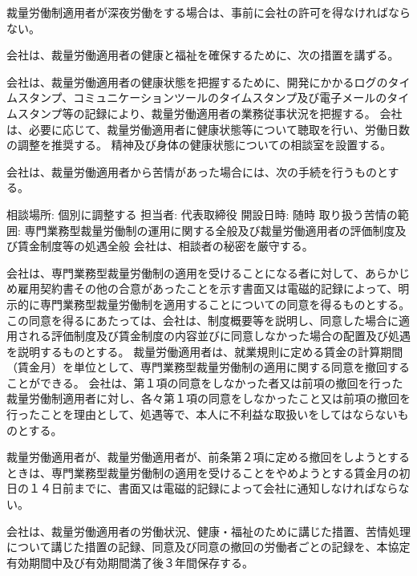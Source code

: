 \documentclass[10pt,a4paper,uplatex]{jsarticle}
\begin{document}
裁量労働制適用者が深夜労働をする場合は、事前に会社の許可を得なければならない。

会社は、裁量労働適用者の健康と福祉を確保するために、次の措置を講ずる。
\begin{enumerate}
    \itm 会社は、裁量労働適用者の健康状態を把握するために、開発にかかるログのタイムスタンプ、コミュニケーションツールのタイムスタンプ及び電子メールのタイムスタンプ等の記録により、裁量労働適用者の業務従事状況を把握する。
    \itm 会社は、必要に応じて、裁量労働適用者に健康状態等について聴取を行い、労働日数の調整を推奨する。
    \itm 精神及び身体の健康状態についての相談室を設置する。
\end{enumerate}

会社は、裁量労働適用者から苦情があった場合には、次の手続を行うものとする。
\begin{enumerate}
    \itm 相談場所: 個別に調整する
    \itm 担当者: 代表取締役
    \itm 開設日時: 随時
    \itm 取り扱う苦情の範囲: 専門業務型裁量労働制の運用に関する全般及び裁量労働適用者の評価制度及び賃金制度等の処遇全般
    \itm 会社は、相談者の秘密を厳守する。
\end{enumerate}

会社は、専門業務型裁量労働制の適用を受けることになる者に対して、あらかじめ雇用契約書その他の合意があったことを示す書面又は電磁的記録によって、明示的に専門業務型裁量労働制を適用することについての同意を得るものとする。この同意を得るにあたっては、会社は、制度概要等を説明し、同意した場合に適用される評価制度及び賃金制度の内容並びに同意しなかった場合の配置及び処遇を説明するものとする。
\term 裁量労働適用者は、就業規則に定める賃金の計算期間（賃金月）を単位として、専門業務型裁量労働制の適用に関する同意を撤回することができる。
\term 会社は、第１項の同意をしなかった者又は前項の撤回を行った裁量労働制適用者に対し、各々第１項の同意をしなかったこと又は前項の撤回を行ったことを理由として、処遇等で、本人に不利益な取扱いをしてはならないものとする。

裁量労働適用者が、裁量労働適用者が、前条第２項に定める撤回をしようとするときは、専門業務型裁量労働制の適用を受けることをやめようとする賃金月の初日の１４日前までに、書面又は電磁的記録によって会社に通知しなければならない。

会社は、裁量労働適用者の労働状況、健康・福祉のために講じた措置、苦情処理について講じた措置の記録、同意及び同意の撤回の労働者ごとの記録を、本協定有効期間中及び有効期間満了後３年間保存する。
\end{document}
